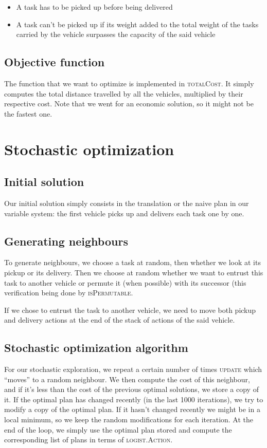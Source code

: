 \documentclass[11pt]{article}
\begin{document}
\begin{itemize}
\item A task has to be picked up before being delivered
\item A task can't be picked up if its weight added to the total weight of the tasks carried by the vehicle surpasses the capacity of the said vehicle
\end{itemize}

\subsection{Objective function}
The function that we want to optimize is implemented in \textsc{totalCost}. It simply computes the total distance travelled by all the vehicles, multiplied by their respective cost. Note that we went for an economic solution, so it might not be the fastest one.


\section{Stochastic optimization}

\subsection{Initial solution}
Our initial solution simply consists in the translation or the naive plan in our variable system: the first vehicle picks up and delivers each task one by one.

\subsection{Generating neighbours}
To generate neighbours, we choose a task at random, then whether we look at its pickup or its delivery. Then we choose at random whether we want to entrust this task to another vehicle or permute it (when possible) with its successor (this verification being done by \textsc{isPermutable}. 

If we chose to entrust the task to another vehicle, we need to move both pickup and delivery actions at the end of the stack of actions of the said vehicle.

\subsection{Stochastic optimization algorithm}
For our stochastic exploration, we repeat a certain number of times \textsc{update} which ``moves'' to a random neighbour. We then compute the cost of this neighbour, and if it's less than the cost of the previous optimal solutions, we store a copy of it. If the optimal plan has changed recently (in the last 1000 iterations), we try to modify a copy of the optimal plan. If it hasn't changed recently we might be in a local minimum, so we keep the random modifications for each iteration. At the end of the loop, we simply use the optimal plan stored and compute the corresponding list of plans in terms of \textsc{logist.Action}. 
\end{document}
